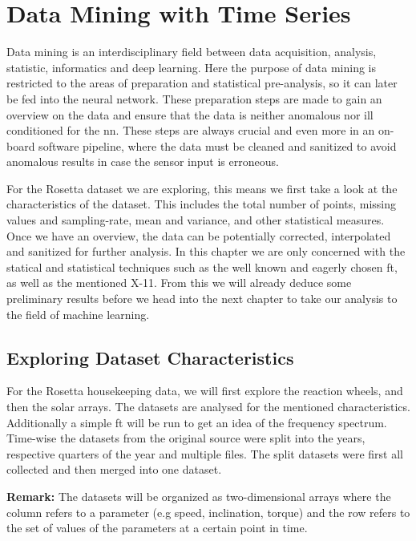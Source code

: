 \chapter{Data Mining with Time Series}
\label{c:datamining}
Data mining is an interdisciplinary field between data acquisition, analysis, statistic, informatics and deep learning. Here the purpose of data mining is restricted to the areas of preparation and statistical pre-analysis, so it can later be fed into the neural network. These preparation steps are made to gain an overview on the data and ensure that the data is neither anomalous nor ill conditioned for the \ac{nn}. \newline
These steps are always crucial and even more in an on-board software pipeline, where the data must be cleaned and sanitized to avoid anomalous results in case the sensor input is erroneous.

For the Rosetta dataset we are exploring, this means we first take a look at the characteristics of the dataset. This includes the total number of points, missing values and sampling-rate, mean and variance, and other statistical measures. Once we have an overview, the data can be potentially corrected, interpolated and sanitized for further analysis. In this chapter we are only concerned with the statical and statistical techniques such as the well known and eagerly chosen \ac{ft}, as well as the mentioned X-11. From this we will already deduce some preliminary results before we head into the next chapter to take our analysis to the field of machine learning.

\section{Exploring Dataset Characteristics}
For the Rosetta housekeeping data, we will first explore the reaction wheels, and then the solar arrays. The datasets are analysed for the mentioned characteristics. Additionally a simple \ac{ft} will be run to get an idea of the frequency spectrum. \newline
Time-wise the datasets from the original source were split into the years, respective quarters of the year and multiple files. The split datasets were first all collected and then merged into one dataset.

\textbf{Remark:} The datasets will be organized as two-dimensional arrays where the column refers to a parameter (e.g speed, inclination, torque) and the row refers to the set of values of the parameters at a certain point in time.

